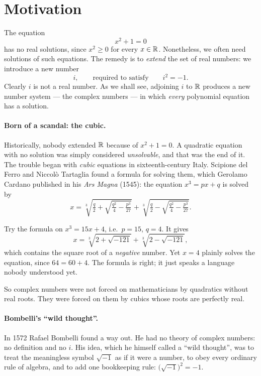 \section{Motivation}

The equation
\[
x^2+1=0
\]
has no real solutions, since $x^2\geq 0$ for every $x\in\mathbb{R}$. Nonetheless, we often need solutions of such
equations. The remedy is to \emph{extend} the set of real numbers: we introduce a new number
\[
i, \qquad \text{required to satisfy} \qquad i^2 = -1.
\]
Clearly $i$ is not a real number. As we shall see, adjoining $i$ to $\mathbb{R}$ produces a new number system — the
complex numbers — in which \emph{every} polynomial equation has a solution.

\paragraph{Born of a scandal: the cubic.} Historically, nobody extended $\mathbb{R}$ because of $x^2+1=0$. A
quadratic equation with no solution was simply considered \emph{unsolvable}, and that was the end of it. The
trouble began with \emph{cubic} equations in sixteenth-century Italy. Scipione del Ferro and Niccolò
Tartaglia found a formula for solving them, which Gerolamo Cardano published in his \emph{Ars Magna} (1545):
the equation $x^3 = px+q$ is solved by
\[
x = \sqrt[3]{\tfrac{q}{2} + \sqrt{\tfrac{q^2}{4} - \tfrac{p^3}{27}}}
  + \sqrt[3]{\tfrac{q}{2} - \sqrt{\tfrac{q^2}{4} - \tfrac{p^3}{27}}}.
\]

\begin{warning}
Try the formula on $x^3 = 15x+4$, i.e.\ $p=15$, $q=4$. It gives
\[
x = \sqrt[3]{2+\sqrt{-121}} + \sqrt[3]{2-\sqrt{-121}},
\]
which contains the square root of a \emph{negative} number. Yet $x=4$ plainly solves the equation, since
$64 = 60+4$. The formula is right; it just speaks a language nobody understood yet.
\end{warning}

\noindent So complex numbers were not forced on mathematicians by quadratics without real roots. They were
forced on them by cubics whose roots are perfectly real.

\paragraph{Bombelli's ``wild thought''.} In 1572 Rafael Bombelli found a way out. He had no theory of
complex numbers: no definition and no $i$. His idea, which he himself called a ``wild thought'', was to
treat the meaningless symbol $\sqrt{-1}$ as if it were a number, to obey every ordinary rule of algebra,
and to add one bookkeeping rule: $\big(\sqrt{-1}\big)^2=-1$.

